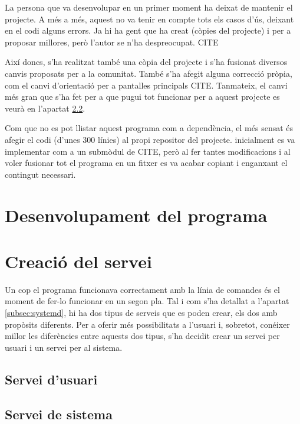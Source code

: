 La persona que va desenvolupar  en un primer moment ha deixat de
mantenir el projecte. A més a més, aquest no va tenir en compte tots els casos
d'ús, deixant en el codi alguns errors. Ja hi ha gent que ha creat 
(còpies del projecte) i  per a proposar millores, però
l'autor se n'ha despreocupat. CITE

Així doncs, s'ha realitzat també una còpia del projecte i s'ha fusionat diversos
canvis proposats per a la comunitat. També s'ha afegit alguna correcció pròpia,
com el canvi d'orientació per a pantalles principals CITE. Tanmateix, el canvi més
gran que s'ha fet per a que pugui tot funcionar per a aquest projecte es veurà
en l'apartat \ref{subsec:systemd_system}.

Com que no es pot llistar aquest programa com a dependència, el més sensat és
afegir el codi (d'unes 300 línies) al propi repositor del projecte. inicialment
es va implementar com a un submòdul de  CITE, però al fer tantes
modificacions i al voler fusionar tot el programa en un fitxer es va acabar
copiant i enganxant el contingut necessari.

\section{Desenvolupament del programa}



\section{Creació del servei }

Un cop el programa funcionava correctament amb la línia de comandes és el moment
de fer-lo funcionar en un segon pla. Tal i com s'ha detallat a l'apartat
\ref{subsec:systemd}, hi ha dos tipus de serveis que es poden crear, els dos
amb propòsits diferents. Per a oferir més possibilitats a l'usuari i, sobretot,
conéixer millor les diferències entre aquests dos tipus, s'ha decidit crear
un servei per usuari i un servei per al sistema.

\subsection{Servei d'usuari}


\subsection{Servei de sistema}
\label{subsec:systemd_system}

